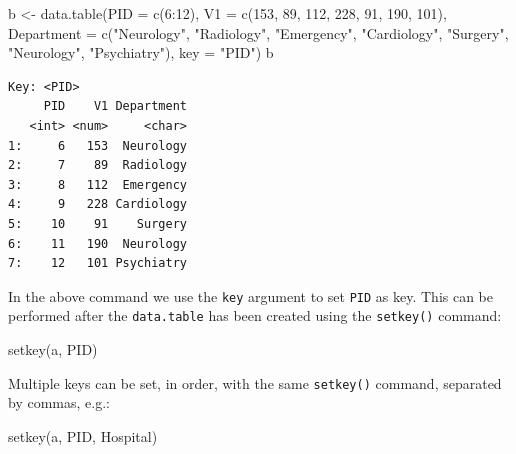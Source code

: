 \documentclass[
]{book}
\newenvironment{Shaded}{\begin{snugshade}}{\end{snugshade}}
\newcommand{\AttributeTok}[1]{\textcolor[rgb]{0.77,0.63,0.00}{#1}}
\newcommand{\DecValTok}[1]{\textcolor[rgb]{0.00,0.00,0.81}{#1}}
\newcommand{\FunctionTok}[1]{\textcolor[rgb]{0.00,0.00,0.00}{#1}}
\newcommand{\NormalTok}[1]{#1}
\newcommand{\OtherTok}[1]{\textcolor[rgb]{0.56,0.35,0.01}{#1}}
\newcommand{\SpecialCharTok}[1]{\textcolor[rgb]{0.00,0.00,0.00}{#1}}
\newcommand{\StringTok}[1]{\textcolor[rgb]{0.31,0.60,0.02}{#1}}
\begin{document}
\begin{Shaded}
\begin{Highlighting}[]
\NormalTok{b }\OtherTok{\textless{}{-}} \FunctionTok{data.table}\NormalTok{(}\AttributeTok{PID =} \FunctionTok{c}\NormalTok{(}\DecValTok{6}\SpecialCharTok{:}\DecValTok{12}\NormalTok{),}
                \AttributeTok{V1 =} \FunctionTok{c}\NormalTok{(}\DecValTok{153}\NormalTok{, }\DecValTok{89}\NormalTok{, }\DecValTok{112}\NormalTok{, }\DecValTok{228}\NormalTok{,  }\DecValTok{91}\NormalTok{, }\DecValTok{190}\NormalTok{, }\DecValTok{101}\NormalTok{),}
                \AttributeTok{Department =} \FunctionTok{c}\NormalTok{(}\StringTok{"Neurology"}\NormalTok{, }\StringTok{"Radiology"}\NormalTok{, }\StringTok{"Emergency"}\NormalTok{,}
                               \StringTok{"Cardiology"}\NormalTok{, }\StringTok{"Surgery"}\NormalTok{, }\StringTok{"Neurology"}\NormalTok{,}
                               \StringTok{"Psychiatry"}\NormalTok{),}
                \AttributeTok{key =} \StringTok{"PID"}\NormalTok{)}
\NormalTok{b}
\end{Highlighting}
\end{Shaded}

\begin{verbatim}
Key: <PID>
     PID    V1 Department
   <int> <num>     <char>
1:     6   153  Neurology
2:     7    89  Radiology
3:     8   112  Emergency
4:     9   228 Cardiology
5:    10    91    Surgery
6:    11   190  Neurology
7:    12   101 Psychiatry
\end{verbatim}

In the above command we use the \texttt{key} argument to set \texttt{PID} as key. This can be performed after the \texttt{data.table} has been created using the \texttt{setkey()} command:

\begin{Shaded}
\begin{Highlighting}[]
\FunctionTok{setkey}\NormalTok{(a, PID)}
\end{Highlighting}
\end{Shaded}

Multiple keys can be set, in order, with the same \texttt{setkey()} command, separated by commas, e.g.:

\begin{Shaded}
\begin{Highlighting}[]
\FunctionTok{setkey}\NormalTok{(a, PID, Hospital)}
\end{Highlighting}
\end{Shaded}
\end{document}
